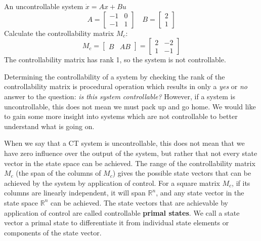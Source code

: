 \begin{example}
  An uncontrollable system $\dot{x}=Ax+Bu$
  \begin{equation*}
    A=
    \left[
      \begin{array}{cc}
        -1 & 0 \\
        -1 & 1
      \end{array}
    \right]
    \quad B=
    \left[
      \begin{array}{c}
        2 \\
        1
      \end{array}
    \right]
  \end{equation*}
  Calculate the controllability matrix $M_{c}$:
  \begin{equation*}
    M_{c}=
    \left[
      \begin{array}{cc}
        B & AB
      \end{array}
    \right]
    =
    \left[
      \begin{array}{cc}
        2 & -2 \\
        1 & -1
      \end{array}
    \right]
  \end{equation*}
  The controllability matrix has rank 1, so the system is not controllable.
\end{example}

Determining the controllability of a system by checking the rank of the controllability matrix is procedural operation which results in only a \textit{yes} or \textit{no} answer to the question: \textit{is this system controllable?} However, if a system is uncontrollable, this does not mean we must pack up and go home.
We would like to gain some more insight into systems which are not controllable to better understand what is going on.

When we say that a CT system is uncontrollable, this does not mean that we have zero influence over the output of the system, but rather that not every state vector in the state space can be achieved.
The range of the controllability matrix $M_{c}$ (the span of the columns of $M_{c}$) gives the possible state vectors that can be achieved by the system by application of control.
For a square matrix $M_{c}$, if its columns are linearly independent, it will span $\mathbb{R}^{n}$, and any state vector in the state space $\mathbb{R}^{n}$ can be achieved.
The state vectors that are achievable by application of control are called controllable \textbf{primal states}.
We call a state vector a primal state to differentiate it from individual state elements or components of the state vector.

